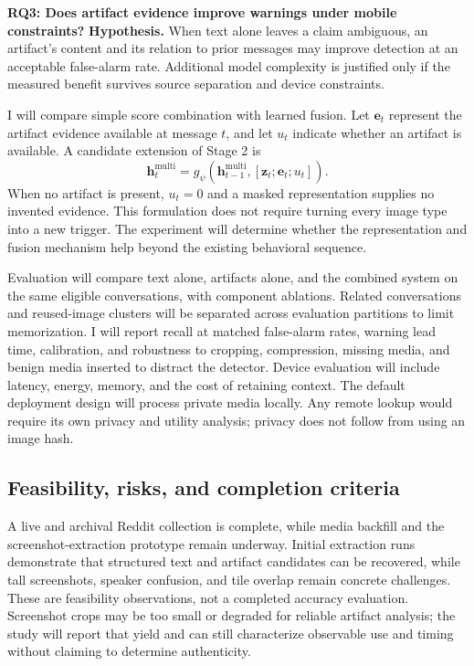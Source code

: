 \documentclass[letterpaper,11pt]{article}
\newcommand{\researchquestion}[1]{\par\medskip\noindent\textbf{#1}\quad}
\begin{document}
\researchquestion{RQ3: Does artifact evidence improve warnings under mobile constraints?}
\textbf{Hypothesis.} When text alone leaves a claim ambiguous, an artifact's
content and its relation to prior messages may improve detection at an acceptable
false-alarm rate. Additional model complexity is justified only if the measured
benefit survives source separation and device constraints.

I will compare simple score combination with learned fusion. Let $\mathbf e_t$
represent the artifact evidence available at message $t$, and let $u_t$ indicate
whether an artifact is available. A candidate extension of Stage 2 is
\begin{equation}
\mathbf h_t^{\mathrm{multi}}=
 g_\psi\!\left(\mathbf h_{t-1}^{\mathrm{multi}},
 [\mathbf z_t;\mathbf e_t;u_t]\right).
\label{eq:fusion}
\end{equation}
When no artifact is present, $u_t=0$ and a masked representation supplies no
invented evidence. This formulation does not require turning every image type
into a new trigger. The experiment will determine whether the representation
and fusion mechanism help beyond the existing behavioral sequence.

Evaluation will compare text alone, artifacts alone, and the combined system on
the same eligible conversations, with component ablations. Related conversations
and reused-image clusters will be separated across evaluation partitions to
limit memorization. I will report recall at matched false-alarm rates, warning
lead time, calibration, and robustness to cropping, compression, missing media,
and benign media inserted to distract the detector. Device evaluation will include
latency, energy, memory, and the cost of retaining context. The default deployment
design will process private media locally. Any remote lookup would require its
own privacy and utility analysis; privacy does not follow from using an image hash.

\subsection{Feasibility, risks, and completion criteria}
A live and archival Reddit collection is complete, while media backfill and the
screenshot-extraction prototype remain underway. Initial extraction runs
demonstrate that structured text and artifact candidates
can be recovered, while tall screenshots, speaker confusion, and tile overlap
remain concrete challenges. These are feasibility observations, not a completed
accuracy evaluation. Screenshot crops may be too small or degraded for reliable
artifact analysis; the study will report that yield and can still characterize
observable use and timing without claiming to determine authenticity.
\end{document}
